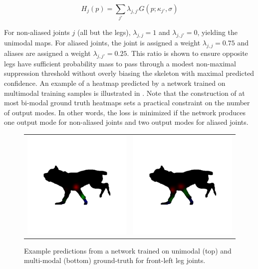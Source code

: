 \begin{equation}
    H_{j}(p) = \sum_{j'} \lambda_{j,j'} G(p; \kappa_{j'}, \sigma)
\end{equation}

For non-aliased joints $j$ (all but the legs), $\lambda_{j,j} = 1$ and $\lambda_{j,j'} = 0$, yielding the unimodal maps. For aliased joints, the joint is assigned a weight $\lambda_{j,j} = 0.75$ and aliases are assigned a weight $\lambda_{j,j'} = 0.25$. This ratio is shown to ensure opposite legs have sufficient probability mass to pass through a modest non-maximal suppression threshold without overly biasing the skeleton with maximal predicted confidence. An example of a heatmap predicted by a network trained on multimodal training samples is illustrated in . Note that the construction of at most bi-modal ground truth heatmaps sets a practical constraint on the number of output modes. In other words, the loss is minimized if the network produces one output mode for non-aliased joints and two output modes for aliased joints. 

% 

\begin{figure}[t]
\centering
\begin{tabular}{cc}
\includegraphics[trim={4cm 10cm 4cm 10cm},clip,width=0.5\linewidth]{single_vs_multi_new/left_heatmap_single.png} &
\includegraphics[trim={4cm 10cm 4cm 10cm},clip,width=0.5\linewidth]{single_vs_multi_new/left_heatmap_multi.png} \\
\end{tabular}
{
\caption{Example predictions from a network trained on unimodal (top) and multi-modal (bottom) ground-truth  for front-left leg joints.}
\label{fig:single_multi}
}
\end{figure}

